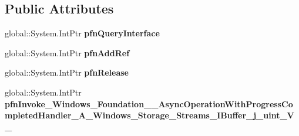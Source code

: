 \subsection*{Public Attributes}
\begin{DoxyCompactItemize}
\item 
\mbox{\label{struct_windows_1_1_foundation_1_1_async_operation_with_progress_completed_handler___a___windows_7e4a9a933abf5a83a91ddfaf1616265a_a6f22f68cac8d2748cb77d7e229e2e54a}} 
global\+::\+System.\+Int\+Ptr {\bfseries pfn\+Query\+Interface}
\item 
\mbox{\label{struct_windows_1_1_foundation_1_1_async_operation_with_progress_completed_handler___a___windows_7e4a9a933abf5a83a91ddfaf1616265a_aac768547052e8d378997acf9e700dfaa}} 
global\+::\+System.\+Int\+Ptr {\bfseries pfn\+Add\+Ref}
\item 
\mbox{\label{struct_windows_1_1_foundation_1_1_async_operation_with_progress_completed_handler___a___windows_7e4a9a933abf5a83a91ddfaf1616265a_a7a7e5050d639bf3b87ddefc6925b4283}} 
global\+::\+System.\+Int\+Ptr {\bfseries pfn\+Release}
\item 
\mbox{\label{struct_windows_1_1_foundation_1_1_async_operation_with_progress_completed_handler___a___windows_7e4a9a933abf5a83a91ddfaf1616265a_a81c81532589ed5194ea7ad08c2072d55}} 
global\+::\+System.\+Int\+Ptr {\bfseries pfn\+Invoke\+\_\+\+Windows\+\_\+\+Foundation\+\_\+\+\_\+\+Async\+Operation\+With\+Progress\+Completed\+Handler\+\_\+\+A\+\_\+\+Windows\+\_\+\+Storage\+\_\+\+Streams\+\_\+\+I\+Buffer\+\_\+j\+\_\+uint\+\_\+\+V\+\_\+}
\end{DoxyCompactItemize}
